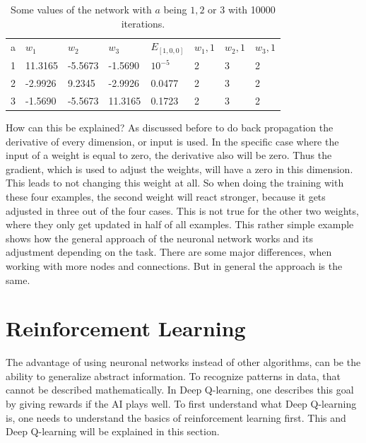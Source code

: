 \documentclass[12pt]{article}
\begin{document}
\begin{table}[h]
\begin{tabular}{lllll|lll}
a & $ w_1 $      & $ w_2 $      & $ w_3 $      & $ E_{[1,0,0]} $     & $ w_1, 1 $ & $ w_2,1 $ & $ w_3, 1 $ \\
1 & 11.3165 & -5.5673 & -1.5690 & $10^{-5} $  & 2   & 3   & 2   \\
2 & -2.9926 & 9.2345  & -2.9926 & 0.0477 & 2   & 3   & 2   \\
3 & -1.5690 & -5.5673 & 11.3165 & 0.1723 & 2   & 3   & 2  
\end{tabular}
\caption{Some values of the network with $a$ being $1,2$ or $3$ with 10000 iterations.}
\label{tab:summary}
\end{table}

How can this be explained? As discussed before to do \gls{back propagation} the derivative of every dimension, or input is used. In the specific case where the input of a weight is equal to zero, the derivative also will be zero. Thus the gradient, which is used to adjust the weights, will have a zero in this dimension. This leads to not changing this weight at all. So when doing the training with these four examples, the second weight will react stronger, because it gets adjusted in three out of the four cases. This is not true for the other two weights, where they only get updated in half of all examples. This rather simple example shows how the general approach of the \gls{neuronal network} works and its adjustment depending on the task. There are some major differences, when working with more nodes and connections. But in general the approach is the same.
\section{Reinforcement Learning}\label{reinflear}
The advantage of using \glspl{neuronal network} instead of other algorithms, can be the ability to generalize abstract information. To recognize patterns in data, that cannot be described mathematically. In \gls{Deep Q-learning}, one describes this goal by giving rewards if the AI plays well. To first understand what \gls{Deep Q-learning} is, one needs to understand the basics of \gls{reinforcement learning} first. This and \gls{Deep Q-learning} will be explained in this section.
\end{document}
